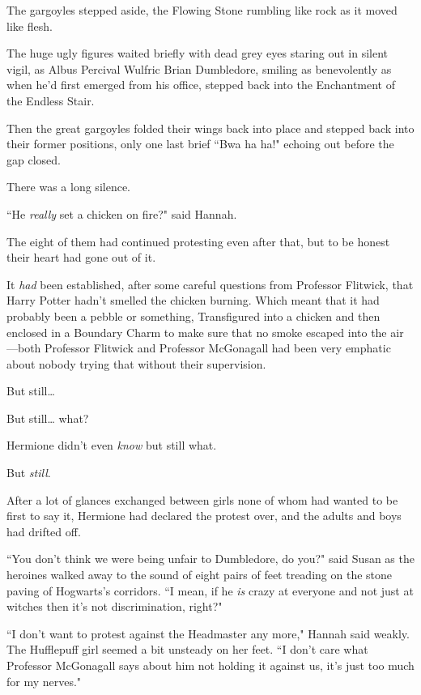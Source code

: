 The gargoyles stepped aside, the Flowing Stone rumbling like rock as it moved like flesh.

The huge ugly figures waited briefly with dead grey eyes staring out in silent vigil, as Albus Percival Wulfric Brian Dumbledore, smiling as benevolently as when he'd first emerged from his office, stepped back into the Enchantment of the Endless Stair.

Then the great gargoyles folded their wings back into place and stepped back into their former positions, only one last brief ``Bwa ha ha!" echoing out before the gap closed.

There was a long silence.

``He \emph{really} set a chicken on fire?" said Hannah.

\later

The eight of them had continued protesting even after that, but to be honest their heart had gone out of it.

It \emph{had} been established, after some careful questions from Professor Flitwick, that Harry Potter hadn't smelled the chicken burning. Which meant that it had probably been a pebble or something, Transfigured into a chicken and then enclosed in a Boundary Charm to make sure that no smoke escaped into the air—both Professor Flitwick and Professor McGonagall had been very emphatic about nobody trying that without their supervision.

But still{\ldots}

But still{\ldots} what?

Hermione didn't even \emph{know} but still what.

But \emph{still}.

After a lot of glances exchanged between girls none of whom had wanted to be first to say it, Hermione had declared the protest over, and the adults and boys had drifted off.

``You don't think we were being unfair to Dumbledore, do you?" said Susan as the heroines walked away to the sound of eight pairs of feet treading on the stone paving of Hogwarts's corridors. ``I mean, if he \emph{is} crazy at everyone and not just at witches then it's not discrimination, right?"

``I don't want to protest against the Headmaster any more," Hannah said weakly. The Hufflepuff girl seemed a bit unsteady on her feet. ``I don't care what Professor McGonagall says about him not holding it against us, it's just too much for my nerves."

